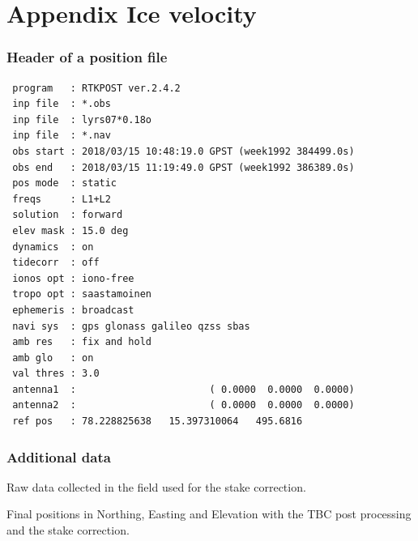 

\chapter{Appendix Ice velocity}
\label{studentxx:appendix}

\subsection*{Header of a position file}
\begin{verbatim}
 program   : RTKPOST ver.2.4.2
 inp file  : *.obs
 inp file  : lyrs07*0.18o
 inp file  : *.nav
 obs start : 2018/03/15 10:48:19.0 GPST (week1992 384499.0s)
 obs end   : 2018/03/15 11:19:49.0 GPST (week1992 386389.0s)
 pos mode  : static
 freqs     : L1+L2
 solution  : forward
 elev mask : 15.0 deg
 dynamics  : on
 tidecorr  : off
 ionos opt : iono-free
 tropo opt : saastamoinen
 ephemeris : broadcast
 navi sys  : gps glonass galileo qzss sbas
 amb res   : fix and hold
 amb glo   : on
 val thres : 3.0
 antenna1  :                       ( 0.0000  0.0000  0.0000)
 antenna2  :                       ( 0.0000  0.0000  0.0000)
 ref pos   : 78.228825638   15.397310064   495.6816
\end{verbatim}

\subsection*{Additional data}

\begin{table}[h]
	\caption{Raw data collected in the field used for the stake correction.}
	\centering
	\begin{turn}{90}
		\scriptsize
		
		\label{GPS:tab:fb_other_tab}
	\end{turn}
\end{table}


\begin{table}[h]
	\caption{Final positions in Northing, Easting and Elevation with the TBC post processing and the stake correction.}
	\centering 
	
	\label{GPS:tab:tbc_tab}
\end{table}

